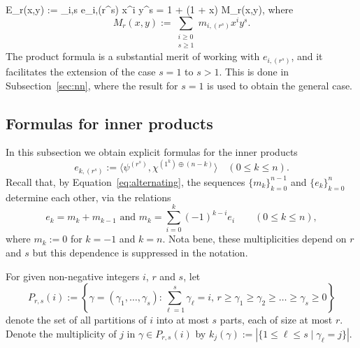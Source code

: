 E_r(x,y) 
:= \sum_{i,s } e_{i,(r^s)} x^i y^s 
= 1 + (1 + x) M_r(x,y),  
\]
where 
\[
M_r(x,y) 
:= \sum_{\substack{i \ge 0 \\ s \ge 1}} m_{i,(r^s)} x^i y^s.
\]
The product formula is a substantial merit of working with $e_{i,(r^s)}$, and it facilitates the extension of the case $s=1$ to $s>1$. 
This is done in Subsection~\ref{sec:nn}, where the result for $s=1$ is used to obtain the general case.
		
	
\subsection{Formulas for inner products}\label{sec:e}
	
In this subsection we obtain explicit formulas for the inner products 
\[
    e_{k,(r^s)} := \langle \psi^{(r^s)}, \chi^{(1^k) \oplus (n-k)} \rangle
    \quad (0 \le k \le n).
\]
Recall that, by Equation~\eqref{eq:alternating}, 
the sequences $\{m_k\}_{k=0}^{n-1}$ and $\{e_k\}_{k=0}^{n}$ 
determine each other, via the relations
\[
    e_k = m_k+m_{k-1}
    \text{ and }
    m_k = \sum_{i=0}^k (-1)^{k-i} e_i
    \qquad (0 \le k \le n),
\]
where $m_k := 0$ for $k = -1$ and $k = n$.
Nota bene, these multiplicities depend on $r$ and $s$
but this dependence is suppressed in the notation.

\begin{definition}\label{def:partition}
    For given non-negative integers $i$, $r$ and $s$, let
    \[
        P_{r,s}(i) 
        := \left\{ \gamma=(\gamma_1,\ldots,\gamma_s) :
        \sum_{\ell = 1}^{s} \gamma_\ell = i,\, r \ge \gamma_1 \ge \gamma_2 \ge \ldots \ge \gamma_s \ge 0 \right\}
    \]
    denote the set of all partitions of $i$ into at most $s$ parts, each of size at most $r$. 
    Denote the multiplicity of $j$ in $\gamma \in P_{r,s}(i)$ by 
    $k_j(\gamma) := |\{1 \leq \ell \leq s \mid \gamma_\ell=j\}|$.
\end{definition}
	
